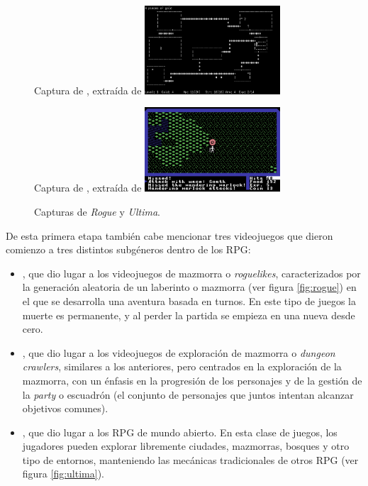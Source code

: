 \smallskip

\begin{figure}[t]
	\centering
	\begin{SubFloat}
		{\label{fig:rogue}%
		Captura de \cite{rogue}, extraída de \cite{rogueimg}}%
		\includegraphics[width=0.45\textwidth]{Imagenes/Vectorial/rogue}%
	\end{SubFloat}
	\qquad
	\begin{SubFloat}
		{\label{fig:ultima}%
		Captura de \cite{ultima}, extraída de \cite{ultimaimg}}%
		\includegraphics[width=0.45\textwidth]{Imagenes/Vectorial/ultima}%
	\end{SubFloat}
	\caption{Capturas de \textit{Rogue} y \textit{Ultima}. \label{fig:rogueultima}}
\end{figure}

De esta primera etapa también cabe mencionar tres videojuegos que dieron comienzo a tres distintos subgéneros dentro de los RPG: 
\begin{itemize}
\item {}, que dio lugar a los videojuegos de mazmorra o \textit{roguelikes}, caracterizados por la generación aleatoria de un laberinto o mazmorra (ver figura \ref{fig:rogue}) en el que se desarrolla una aventura basada en turnos. En este tipo de juegos la muerte es permanente, y al perder la partida se empieza en una nueva desde cero. 
\item {}, que dio lugar a los videojuegos de exploración de mazmorra o \textit{dungeon crawlers}, similares a los anteriores, pero centrados en la exploración de la mazmorra, con un énfasis en la progresión de los personajes y de la gestión de la \textit{party} o escuadrón (el conjunto de personajes que juntos intentan alcanzar objetivos comunes). 
\item {}, que dio lugar a los RPG de mundo abierto. En esta clase de juegos, los jugadores pueden explorar libremente ciudades, mazmorras, bosques y otro tipo de entornos, manteniendo las mecánicas tradicionales de otros RPG (ver figura \ref{fig:ultima}). 
\end{itemize}

